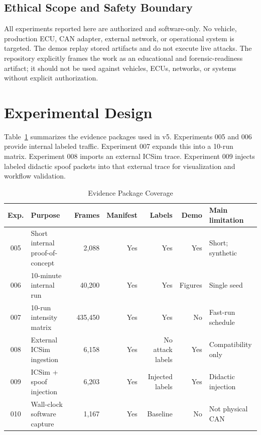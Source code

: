 \documentclass[conference]{IEEEtran}
\begin{document}
\subsection{Ethical Scope and Safety Boundary}
All experiments reported here are authorized and software-only. No vehicle, production ECU, CAN adapter, external network, or operational system is targeted. The demos replay stored artifacts and do not execute live attacks. The repository explicitly frames the work as an educational and forensic-readiness artifact; it should not be used against vehicles, ECUs, networks, or systems without explicit authorization.

\section{Experimental Design}
Table~\ref{tab:evidence} summarizes the evidence packages used in v5. Experiments 005 and 006 provide internal labeled traffic. Experiment 007 expands this into a 10-run matrix. Experiment 008 imports an external ICSim trace. Experiment 009 injects labeled didactic spoof packets into that external trace for visualization and workflow validation.

\begin{table}[t]
\caption{Evidence Package Coverage}
\label{tab:evidence}
\centering
\footnotesize
\begin{tabular}{clrrrrl}
\toprule
Exp. & Purpose & Frames & Manifest & Labels & Demo & Main limitation \\
\midrule
005 & Short internal proof-of-concept & 2,088 & Yes & Yes & Yes & Short; synthetic \\
006 & 10-minute internal run & 40,200 & Yes & Yes & Figures & Single seed \\
007 & 10-run intensity matrix & 435,450 & Yes & Yes & No & Fast-run schedule \\
008 & External ICSim ingestion & 6,158 & Yes & No attack labels & Yes & Compatibility only \\
009 & ICSim + spoof injection & 6,203 & Yes & Injected labels & Yes & Didactic injection \\
010 & Wall-clock software capture & 1,167 & Yes & Baseline & No & Not physical CAN \\
\bottomrule
\end{tabular}
\end{table}
\end{document}
